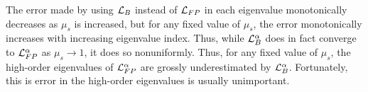 The error made by using  $\mathcal{L}_B$ instead of $\mathcal{L}_{FP}$ in each eigenvalue 
monotonically decreases as $\mu_s$ is increased, but for any fixed value of $\mu_s$, 
the error monotonically increases with increasing eigenvalue
index\cite{morel_96}. Thus, while $\mathcal{L}_B^{\alpha}$ does in fact converge to
$\mathcal{L}_{FP}^{\alpha}$ as $\mu_s\rightarrow 1$, it does so nonuniformly. Thus, for any
fixed value of $\mu_s$, the high-order eigenvalues of $\mathcal{L}_{FP}^{\alpha}$ are 
grossly underestimated by $\mathcal{L}_B^{\alpha}$. Fortunately, this is error in the 
high-order eigenvalues is usually unimportant\cite{morel_96}.
